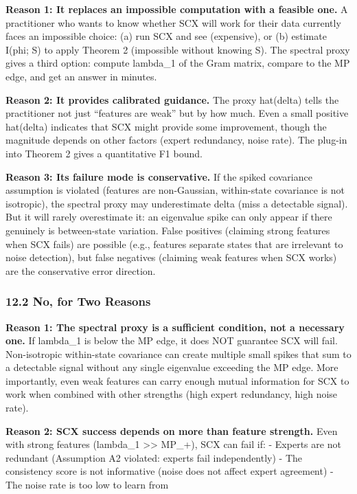 \documentclass[
  12pt,
]{article}
\begin{document}
\textbf{Reason 1: It replaces an impossible computation with a feasible
one.} A practitioner who wants to know whether SCX will work for their
data currently faces an impossible choice: (a) run SCX and see
(expensive), or (b) estimate I(phi; S) to apply Theorem 2 (impossible
without knowing S). The spectral proxy gives a third option: compute
lambda\_1 of the Gram matrix, compare to the MP edge, and get an answer
in minutes.

\textbf{Reason 2: It provides calibrated guidance.} The proxy hat(delta)
tells the practitioner not just ``features are weak'' but by how much.
Even a small positive hat(delta) indicates that SCX might provide some
improvement, though the magnitude depends on other factors (expert
redundancy, noise rate). The plug-in into Theorem 2 gives a quantitative
F1 bound.

\textbf{Reason 3: Its failure mode is conservative.} If the spiked
covariance assumption is violated (features are non-Gaussian,
within-state covariance is not isotropic), the spectral proxy may
underestimate delta (miss a detectable signal). But it will rarely
overestimate it: an eigenvalue spike can only appear if there genuinely
is between-state variation. False positives (claiming strong features
when SCX fails) are possible (e.g., features separate states that are
irrelevant to noise detection), but false negatives (claiming weak
features when SCX works) are the conservative error direction.

\subsubsection{12.2 No, for Two Reasons}\label{no-for-two-reasons}

\textbf{Reason 1: The spectral proxy is a sufficient condition, not a
necessary one.} If lambda\_1 is below the MP edge, it does NOT guarantee
SCX will fail. Non-isotropic within-state covariance can create multiple
small spikes that sum to a detectable signal without any single
eigenvalue exceeding the MP edge. More importantly, even weak features
can carry enough mutual information for SCX to work when combined with
other strengths (high expert redundancy, high noise rate).

\textbf{Reason 2: SCX success depends on more than feature strength.}
Even with strong features (lambda\_1 \textgreater\textgreater{} MP\_+),
SCX can fail if: - Experts are not redundant (Assumption A2 violated:
experts fail independently) - The consistency score is not informative
(noise does not affect expert agreement) - The noise rate is too low to
learn from
\end{document}
